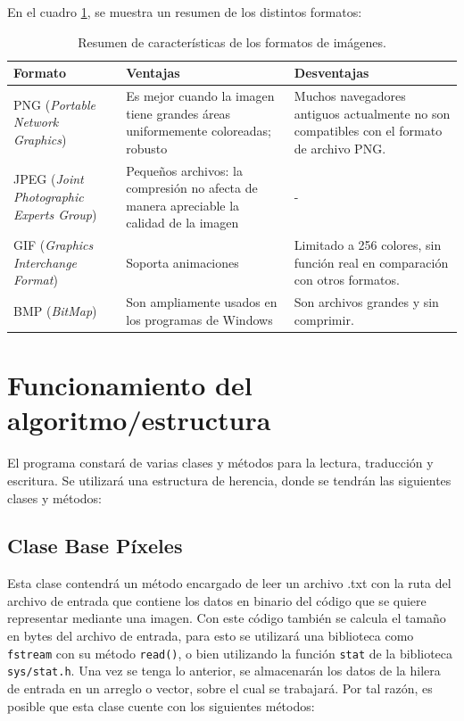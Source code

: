En el cuadro \ref{T:T111}, se muestra un resumen de los distintos formatos: 

\begin{table}[H]
\begin{center}
    \begin{tabular}{ |>{\centering\arraybackslash}m{4cm}|>{\centering\arraybackslash}m{5.5cm}|>{\centering\arraybackslash}m{5.5cm}| }
    	\hline
    	\cellcolor{cl} \textbf{Formato} & \cellcolor{cl} \textbf{Ventajas} & \cellcolor{cl} \textbf{Desventajas}\\ \hline \hline
    	PNG (\textit{Portable Network Graphics}) & Es mejor cuando la imagen tiene grandes áreas uniformemente coloreadas; robusto& Muchos navegadores antiguos actualmente no son compatibles con el formato de archivo PNG. \\
    	\hline
    	JPEG (\textit{Joint Photographic Experts Group}) & Pequeños archivos: la compresión no afecta de manera apreciable la calidad de la imagen & - \\
    	\hline
    	GIF (\textit{Graphics Interchange Format}) & Soporta animaciones & Limitado a 256 colores, sin función real en comparación con otros formatos.\\
    	\hline
    	BMP (\textit{BitMap}) &Son ampliamente usados en los programas de Windows&Son archivos grandes y sin comprimir.\\
    	\hline
    \end{tabular}
\end{center}
\label{T:T111}
\caption{Resumen de características de los formatos de imágenes. \cite{R1}}
\end{table}


\section{Funcionamiento del algoritmo/estructura}
El programa constará de varias clases y métodos para la lectura, traducción y escritura. Se utilizará una estructura de herencia, donde se tendrán las siguientes clases y métodos:
\subsection{Clase Base Píxeles}
Esta clase contendrá un método encargado de leer un archivo .txt con la ruta del archivo de entrada que contiene los datos en binario del código que se quiere representar mediante una imagen. Con este código también se calcula el tamaño en bytes del archivo de entrada, para esto se utilizará una biblioteca como \texttt{fstream} con su método \texttt{read()}, o bien utilizando la función \texttt{stat} de la biblioteca \texttt{sys/stat.h}. Una vez se tenga lo anterior, se almacenarán los datos de la hilera de entrada en un arreglo o vector, sobre el cual se trabajará. Por tal razón, es posible que esta clase cuente con los siguientes métodos:

